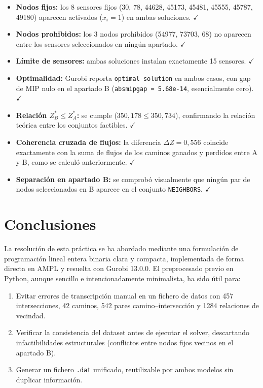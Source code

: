 \documentclass[12pt,a4paper]{article}
\begin{document}
\begin{itemize}[itemsep=6pt]
    \item \textbf{Nodos fijos:} los 8 sensores fijos (30, 78, 44628, 45173, 45481, 45555, 45787, 49180) aparecen activados ($x_i = 1$) en ambas soluciones. $\checkmark$
    \item \textbf{Nodos prohibidos:} los 3 nodos prohibidos (54977, 73703, 68) no aparecen entre los sensores seleccionados en ningún apartado. $\checkmark$
    \item \textbf{Límite de sensores:} ambas soluciones instalan exactamente 15 sensores. $\checkmark$
    \item \textbf{Optimalidad:} Gurobi reporta \texttt{optimal solution} en ambos casos, con gap de MIP nulo en el apartado B (\texttt{absmipgap = 5.68e-14}, esencialmente cero). $\checkmark$
    \item \textbf{Relación $Z^*_B \leq Z^*_A$:} se cumple ($350{,}178 \leq 350{,}734$), confirmando la relación teórica entre los conjuntos factibles. $\checkmark$
    \item \textbf{Coherencia cruzada de flujos:} la diferencia $\Delta Z = 0{,}556$ coincide exactamente con la suma de flujos de los caminos ganados y perdidos entre A y B, como se calculó anteriormente. $\checkmark$
    \item \textbf{Separación en apartado B:} se comprobó visualmente que ningún par de nodos seleccionados en B aparece en el conjunto \texttt{NEIGHBORS}. $\checkmark$
\end{itemize}

\section{Conclusiones}

La resolución de esta práctica se ha abordado mediante una formulación de programación lineal entera binaria clara y compacta, implementada de forma directa en AMPL y resuelta con Gurobi 13.0.0. El preprocesado previo en Python, aunque sencillo e intencionadamente minimalista, ha sido útil para:

\begin{enumerate}[itemsep=4pt]
    \item Evitar errores de transcripción manual en un fichero de datos con 457 intersecciones, 42 caminos, 542 pares camino--intersección y 1284 relaciones de vecindad.
    \item Verificar la consistencia del dataset antes de ejecutar el solver, descartando infactibilidades estructurales (conflictos entre nodos fijos vecinos en el apartado B).
    \item Generar un fichero \texttt{.dat} unificado, reutilizable por ambos modelos sin duplicar información.
\end{enumerate}
\end{document}

